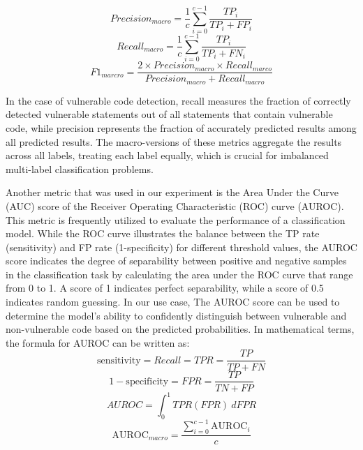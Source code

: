 \documentclass{ieeeaccess}
\begin{document}
\begin{equation}\label{equa:metric4}Precision_{macro}= \frac{1}{c} \sum _{i=0}^{c-1}\frac{TP_i}{TP_i+FP_i}\end{equation}
\begin{equation}\label{equa:metric5}Recall_{macro}= \frac{1}{c} \sum _{i=0}^{c-1}\frac{TP_i}{TP_i+FN_i}\end{equation}
\begin{equation}\label{equa:metric6}
F1_{marcro}=\frac{2 \times Precision_{macro} \times Recall_{marco}}{Precision_{macro} + Recall_{macro}}
\end{equation}

\par In the case of vulnerable code detection, recall measures the fraction of correctly detected vulnerable statements out of all statements that contain vulnerable code, while precision represents the fraction of accurately predicted results among all predicted results. The macro-versions of these metrics aggregate the results across all labels, treating each label equally, which is crucial for imbalanced multi-label classification problems. 
\par Another metric that was used in our experiment is  the  Area Under the Curve (AUC) score of the Receiver Operating Characteristic (ROC) curve (AUROC). This metric  is frequently utilized to evaluate the performance of a classification model.  While the ROC curve illustrates the balance between the TP rate (sensitivity) and FP rate (1-specificity) for different threshold values, the AUROC score indicates the degree of separability between positive and negative samples in the classification task by calculating the area under the ROC curve that range from 0 to 1. A score of 1 indicates perfect separability, while a score of 0.5 indicates random guessing. In our use case,  The AUROC score can be used to determine the model's ability to confidently distinguish between vulnerable and non-vulnerable code based on the predicted probabilities.  In mathematical terms, the formula for AUROC can be written as:
\begin{equation} \label{equa:TPR}
  \mathrm{sensitivity}= Recall =  TPR = \frac{TP}{TP + FN} 
\end{equation}
\begin{equation}\label{equa:FPR}
    1 - \mathrm{specificity} = FPR = \frac{TP}{TN + FP}
\end{equation}
\begin{equation} \label{equa:metric7}
AUROC = \int_{0}^{1} TPR(FPR) \ dFPR
\end{equation}
\begin{equation} \label{equa:metric8}
    \mathrm{AUROC}_{macro} = \frac{\sum_{i=0}^{c-1} \mathrm{AUROC}_i}{c}
\end{equation}
\end{document}
